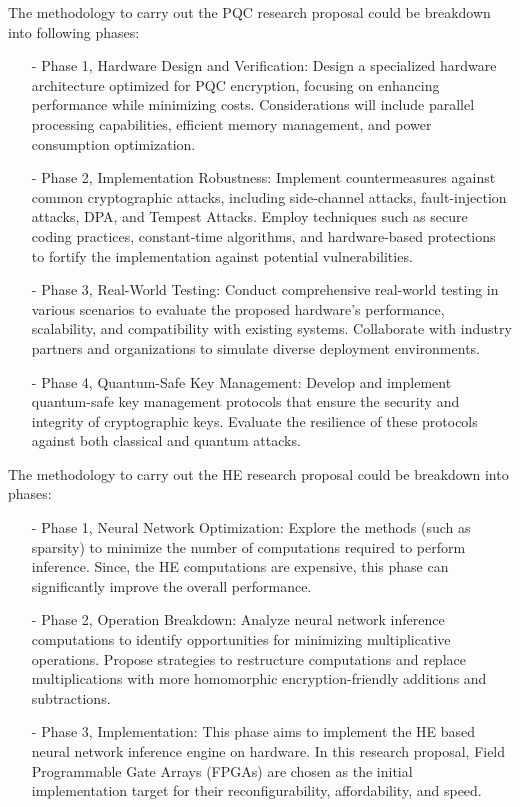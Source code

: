 \begin {itemize}
  The methodology to carry out  the PQC research proposal could be breakdown into following phases:
 \begin{itemize}
 \item [-]  Phase 1, Hardware Design and Verification: Design a specialized hardware architecture optimized for PQC encryption, focusing on enhancing performance while minimizing costs. Considerations will include parallel processing capabilities, efficient memory management, and power consumption optimization.
 \item [-]  Phase 2, Implementation Robustness: Implement countermeasures against common cryptographic attacks, including side-channel attacks, fault-injection attacks, DPA, and Tempest Attacks. Employ techniques such as secure coding practices, constant-time algorithms, and hardware-based protections to fortify the implementation against potential vulnerabilities.
  \item [-]  Phase 3, Real-World Testing:
Conduct comprehensive real-world testing in various scenarios to evaluate the proposed hardware's performance, scalability, and compatibility with existing systems. Collaborate with industry partners and organizations to simulate diverse deployment environments.
  \item [-]  Phase 4, Quantum-Safe Key Management:
Develop and implement quantum-safe key management protocols that ensure the security and integrity of cryptographic keys. Evaluate the resilience of these protocols against both classical and quantum attacks.
 \end{itemize}
 The methodology to carry out the HE research proposal could be breakdown into phases:
     \begin{itemize}
     \item [-]  Phase 1, Neural Network Optimization: Explore the methods (such as sparsity) to minimize the number of computations required to perform inference. Since, the HE computations are expensive, this phase can significantly improve the overall performance. 
     \item [-]  Phase 2, Operation Breakdown: Analyze neural network inference computations to identify opportunities for minimizing multiplicative operations. Propose strategies to restructure computations and replace multiplications with more homomorphic encryption-friendly additions and subtractions.
     \item [-] Phase 3, Implementation: This phase aims to implement the HE based neural network inference engine on hardware. In this research proposal, Field Programmable Gate Arrays (FPGAs) are chosen as the initial implementation target for their reconfigurability, affordability, and speed.
      

\end{itemize}
\end{itemize}
